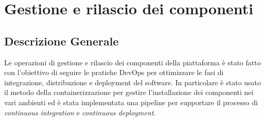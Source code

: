 \chapter{Gestione e rilascio dei componenti}
\section{Descrizione Generale}
Le operazioni di gestione e rilascio dei componenti della piattaforma è stato fatto con l'obiettivo
di seguire le pratiche DevOps per ottimizzare le fasi di integrazione, distribuzione e deployment
del software. In particolare è stato usato il metodo della containerizzazione per gestire l'installazione dei componenti
nei vari ambienti ed è stata implementata una pipeline per supportare il processo di \textit{continuous integration}
e \textit{continuous deployment}.



